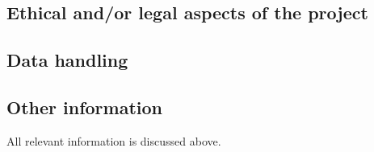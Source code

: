 
 \subsection{Ethical and/or legal aspects of the project}


\subsection{Data handling}


\subsection{Other information}

All relevant information is discussed above. 